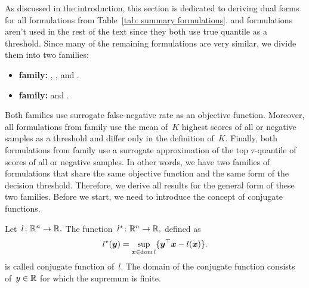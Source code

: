 As discussed in the introduction, this section is dedicated to deriving dual forms for all formulations from Table~\ref{tab: summary formulations}. \Grill and \GrillNP formulations aren't used in the rest of the text since they both use true quantile as a threshold. Since many of the remaining formulations are very similar, we divide them into two families:
\begin{itemize}
  \item \textbf{\TopPushK family:} \TopPush, \TopPushK, \TopMeanK and \tauFPL.
  \item \textbf{\PatMat family:} \PatMat and \PatMatNP.
\end{itemize}
Both families use surrogate false-negative rate as an objective function. Moreover, all formulations from \TopPushK family use the mean of~$K$ highest scores of all or negative samples as a threshold and differ only in the definition of~$K.$ Finally, both formulations from \PatMat family use a surrogate approximation of the top $\tau$-quantile of scores of all or negative samples. In other words, we have two families of formulations that share the same objective function and the same form of the decision threshold. Therefore, we derive all results for the general form of these two families. Before we start, we need to introduce the concept of conjugate functions.

\pagebreak

\begin{definition}\label{def: conjugate}
  Let~$l \colon \mathbb{R}^n \to \mathbb{R}.$ The function~$l^{\star} \colon \mathbb{R}^n \to \mathbb{R},$ defined as
  \begin{equation*}
    l^{\star} (\bm{y})
      =  \sup_{\bm{x} \in \operatorname*{dom} l} \{\bm{y}^{\top}\bm{x} - l(\bm{x})\}.
  \end{equation*}
  is called conjugate function of~$l.$ The domain of the conjugate function
  consists of~$y \in \mathbb{R}$ for which the supremum is finite. 
\end{definition}


